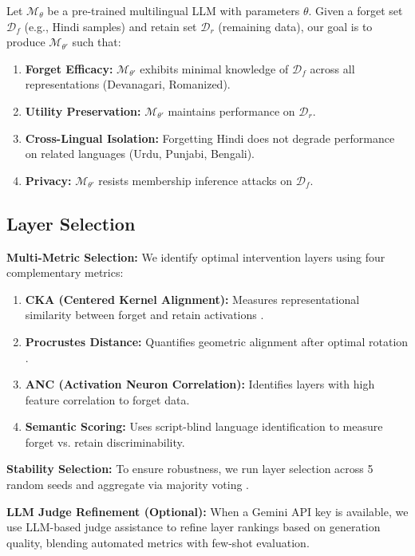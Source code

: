 \documentclass[11pt]{article}
\begin{document}
Let $\mathcal{M}_\theta$ be a pre-trained multilingual LLM with parameters $\theta$. Given a forget set $\mathcal{D}_f$ (e.g., Hindi samples) and retain set $\mathcal{D}_r$ (remaining data), our goal is to produce $\mathcal{M}_{\theta'}$ such that:

\begin{enumerate}
    \item \textbf{Forget Efficacy:} $\mathcal{M}_{\theta'}$ exhibits minimal knowledge of $\mathcal{D}_f$ across all representations (Devanagari, Romanized).
    \item \textbf{Utility Preservation:} $\mathcal{M}_{\theta'}$ maintains performance on $\mathcal{D}_r$.
    \item \textbf{Cross-Lingual Isolation:} Forgetting Hindi does not degrade performance on related languages (Urdu, Punjabi, Bengali).
    \item \textbf{Privacy:} $\mathcal{M}_{\theta'}$ resists membership inference attacks on $\mathcal{D}_f$.
\end{enumerate}

\subsection{Layer Selection}

\textbf{Multi-Metric Selection:} We identify optimal intervention layers using four complementary metrics:

\begin{enumerate}
    \item \textbf{CKA (Centered Kernel Alignment):} Measures representational similarity between forget and retain activations \cite{kornblith2019similarity}.
    \item \textbf{Procrustes Distance:} Quantifies geometric alignment after optimal rotation \cite{schonemann1966generalized}.
    \item \textbf{ANC (Activation Neuron Correlation):} Identifies layers with high feature correlation to forget data.
    \item \textbf{Semantic Scoring:} Uses script-blind language identification to measure forget vs. retain discriminability.
\end{enumerate}

\textbf{Stability Selection:} To ensure robustness, we run layer selection across 5 random seeds and aggregate via majority voting \cite{meinshausen2010stability}.

\textbf{LLM Judge Refinement (Optional):} When a Gemini API key is available, we use LLM-based judge assistance to refine layer rankings based on generation quality, blending automated metrics with few-shot evaluation.
\end{document}
